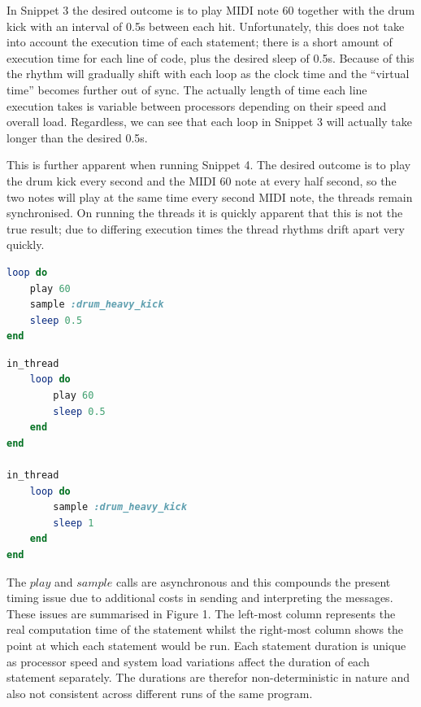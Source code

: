\documentclass[11pt]{scrartcl}
\begin{document}
\begin{multicols}{2}
In Snippet 3 the desired outcome is to play MIDI note 60 together with the 
drum kick with an interval of 0.5s between each hit. Unfortunately, this does 
not take into account the execution time of each statement; there is a short 
amount of execution time for each line of code, plus the desired sleep of 0.5s.
Because of this the rhythm will gradually shift with each loop as the 
clock time and the ``virtual time'' becomes further out of sync. The 
actually length of time each line execution takes is variable between 
processors depending on their speed and overall load. Regardless, we can see 
that each loop in Snippet 3 will actually take longer than the desired 0.5s.

This is further apparent when running Snippet 4. The desired outcome is to 
play the drum kick every second and the MIDI 60 note at every half second, so 
the two notes will play at the same time every second MIDI note, the threads 
remain synchronised. On running the threads it is quickly apparent that this 
is not the true result; due to differing execution times the thread rhythms 
drift apart very quickly.

	\begin{minipage}{0.5\textwidth}

		\begin{minipage}{\textwidth}
			\begin{lstlisting}[language = ruby]
loop do
    play 60
    sample :drum_heavy_kick
    sleep 0.5
end
			\end{lstlisting}
		\end{minipage}

		\begin{minipage}{\textwidth}
			\begin{lstlisting}[language = ruby]
in_thread
    loop do
        play 60
        sleep 0.5
    end
end

in_thread
    loop do
        sample :drum_heavy_kick
        sleep 1
    end
end
			\end{lstlisting}
		\end{minipage}

	\end{minipage}

\end{multicols}

The $play$ and $sample$ calls are asynchronous and this compounds the present 
timing issue due to additional costs in sending and interpreting the messages. 
These issues are summarised in Figure 1. The left-most column represents the 
real computation time of the statement whilst the right-most column shows the 
point at which each statement would be run. Each statement duration is unique 
as processor speed and system load variations affect the duration of each 
statement separately. The durations are therefor non-deterministic in nature 
and also not consistent across different runs of the same program.
\end{document}
